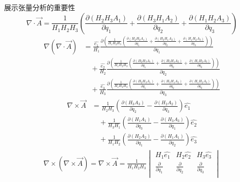 \documentclass[12pt, a4paper, oneside, UTF8]{ctexbook}  %
\begin{document}
\begin{add}
    展示张量分析的重要性
    \[\nabla \cdot \vec{A} = \frac{1}{H_1 H_2 H_3} \left( 
        \frac{\partial (H_2 H_3 A_1)}{\partial q_1} + 
        \frac{\partial (H_3 H_1 A_2)}{\partial q_2} + 
        \frac{\partial (H_1 H_2 A_3)}{\partial q_3} 
        \right)\]
        \begin{align*}
            \nabla(\nabla\cdot\vec{A})&=
            \frac{\hat{e_1}}{H_1} \frac{\partial \left(\frac{1}{H_1 H_2 H_3} \left( 
                \frac{\partial (H_2 H_3 A_1)}{\partial q_1} + 
                \frac{\partial (H_3 H_1 A_2)}{\partial q_2} + 
                \frac{\partial (H_1 H_2 A_3)}{\partial q_3} 
                \right)\right)}{\partial q_1} \\
            &\quad+ \frac{\hat{e_2}}{H_2} \frac{\partial \left(\frac{1}{H_1 H_2 H_3} \left( 
                \frac{\partial (H_2 H_3 A_1)}{\partial q_1} + 
                \frac{\partial (H_3 H_1 A_2)}{\partial q_2} + 
                \frac{\partial (H_1 H_2 A_3)}{\partial q_3} 
                \right)\right)}{\partial q_2} \\
            &\quad+ \frac{\hat{e_3}}{H_3} \frac{\partial \left(\frac{1}{H_1 H_2 H_3} \left( 
                \frac{\partial (H_2 H_3 A_1)}{\partial q_1} + 
                \frac{\partial (H_3 H_1 A_2)}{\partial q_2} + 
                \frac{\partial (H_1 H_2 A_3)}{\partial q_3} 
                \right)\right)}{\partial q_3}
        \end{align*}
        \begin{align*}
            \nabla \times \vec{A} &= \frac{1}{H_2 H_3} \left( \frac{\partial (H_3 A_3)}{\partial q_2} - \frac{\partial (H_2 A_2)}{\partial q_3} \right) \hat{e_1} \\
&\quad+ \frac{1}{H_3 H_1} \left( \frac{\partial (H_1 A_1)}{\partial q_3} - \frac{\partial (H_3 A_3)}{\partial q_1} \right) \hat{e_2} \\
&\quad+ \frac{1}{H_1 H_2} \left( \frac{\partial (H_2 A_2)}{\partial q_1} - \frac{\partial (H_1 A_1)}{\partial q_2} \right) \hat{e_3}
        \end{align*}
        \begin{gather*}
            \nabla\times(\nabla\times\vec{A})=
            \nabla \times \vec{A} = \frac{1}{H_1 H_2 H_3} 
            \begin{vmatrix}
            H_1 \hat{e_1} & H_2 \hat{e_2} & H_3 \hat{e_3} \\
            \frac{\partial}{\partial q_1} & \frac{\partial}{\partial q_2} & \frac{\partial}{\partial q_3} \\

\end{vmatrix}
\end{gather*}
\end{add}
\end{document}
